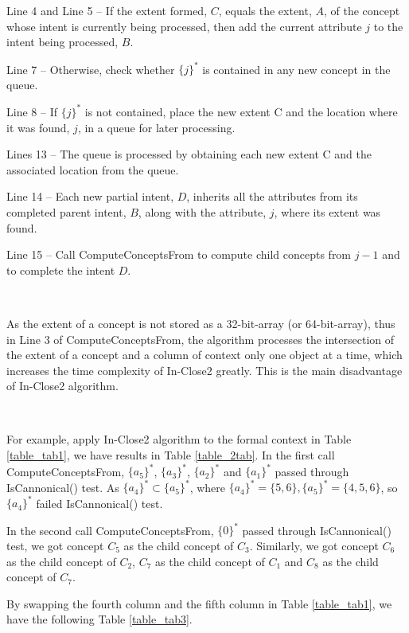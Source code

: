 \documentclass[11pt]{article}
\numberwithin{equation}{subsection}
\begin{document}
Line 4 and Line 5 -- If the extent formed, $C$, equals the extent, $A$, of the concept whose intent is currently being processed, then   add the current attribute $j$ to the intent being processed, $B$.

Line 7 -- Otherwise, check whether $\{j\}^*$ is contained in any new concept in the queue.

Line 8 -- If $\{j\}^*$ is not contained, place the new extent C and the location where it was found, $j$, in a queue for later processing.

Lines 13 -- The queue is processed by obtaining each new extent C and the associated location from the queue.

Line 14 -- Each new partial intent, $D$, inherits all the attributes from its completed parent intent, $B$, along with the attribute, $j$, where its extent was found.

Line 15 -- Call ComputeConceptsFrom to compute child concepts from $j-1$ and to complete the intent $D$.

\

 As the extent of a concept is not stored as a 32-bit-array (or 64-bit-array), thus in Line 3 of ComputeConceptsFrom,  the  algorithm  processes the intersection of the extent of a concept and a column of context only one object at a time, which increases the time complexity of  In-Close2 greatly. This is the main disadvantage of In-Close2 algorithm.

\

For example, apply In-Close2 algorithm to the formal context in Table \ref{table_tab1}, we have results in Table \ref{table_2tab}.
In the first call ComputeConceptsFrom,  $\{a_5\}^*$, $\{a_3\}^*$, $\{a_2\}^*$ and $\{a_1\}^*$   passed through IsCannonical() test.
As $\{a_4\}^*\subset \{a_5\}^*$,  where $\{a_4\}^*=\{5,6\}, \{a_5\}^*=\{4,5,6\}$, so $\{a_4\}^*$   failed IsCannonical() test.

In the second call ComputeConceptsFrom, $\{0\}^*$   passed through IsCannonical() test, we got concept $C_5$ as the child concept of $C_3$.
Similarly, we got concept $C_6$ as the child concept of $C_2$,  $C_7$ as the child concept of $C_1$ and $C_8$ as the child concept of $C_7$.

 By swapping the fourth column and the fifth column in Table \ref{table_tab1}, we have the following Table \ref{table_tab3}.
\end{document}
